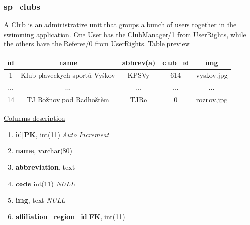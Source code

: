 \subsubsection*{sp\_clubs}
A Club is an administrative unit that groups a bunch of users together in the swimming application. One User has the ClubManager/1 from UserRights, while the others have the Referee/0 from UserRights.
\newline
\underline{Table preview}
\begin{center}
 \begin{tabular}{||c c c c c||} 
 \hline
 id & name & abbrev(a) & club\_id & img \\ [0.5ex] 
 \hline\hline
 1 & Klub plaveckých sportů Vyškov & KPSVy & 614 & vyskov.jpg \\  
 \hline
 ... & ... & ... & ... & ... \\ [0.5ex]
\hline
 14 & TJ Rožnov pod Radhoštěm & TJRo & 0 & roznov.jpg \\
 \hline
\end{tabular}
\end{center}
\underline{Columns description}
\begin{enumerate}
  \setlength\itemsep{0em}
  \item \textbf{id$|$PK}, int(11) \textit{Auto Increment}
  \item \textbf{name}, varchar(80)
  \item \textbf{abbreviation}, text
  \item \textbf{code} int(11) \textit{NULL}
  \item \textbf{img}, text \textit{NULL}
  \item \textbf{affiliation\_region\_id$|$FK}, int(11)
\end{enumerate}

